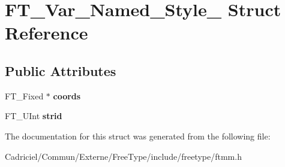 \hypertarget{struct_f_t___var___named___style__}{\section{F\-T\-\_\-\-Var\-\_\-\-Named\-\_\-\-Style\-\_\- Struct Reference}
\label{struct_f_t___var___named___style__}
}
\subsection*{Public Attributes}
\begin{DoxyCompactItemize}
\item 
\hypertarget{struct_f_t___var___named___style___a07195d55aee541db651ef3a8b04bb41f}{F\-T\-\_\-\-Fixed $\ast$ {\bfseries coords}}\label{struct_f_t___var___named___style___a07195d55aee541db651ef3a8b04bb41f}

\item 
\hypertarget{struct_f_t___var___named___style___a7802f6958c6e883bdce16b9931002826}{F\-T\-\_\-\-U\-Int {\bfseries strid}}\label{struct_f_t___var___named___style___a7802f6958c6e883bdce16b9931002826}

\end{DoxyCompactItemize}


The documentation for this struct was generated from the following file\-:\begin{DoxyCompactItemize}
\item 
Cadriciel/\-Commun/\-Externe/\-Free\-Type/include/freetype/ftmm.\-h\end{DoxyCompactItemize}
